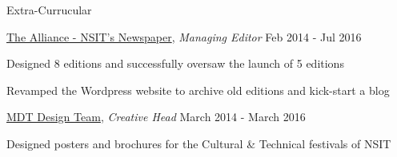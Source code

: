 \documentclass{resume} %
\begin{document}

        



\begin{rSection}{Extra-Currucular} \itemsep -3pt

    \begin{rSubsection}
        {\href{http://alliancensit.com/our-editions/}{The Alliance - NSIT's Newspaper}, {\normalfont \em Managing Editor}}
            {Feb 2014 - Jul 2016}
        {}{}
        
        \item Designed 8 editions and successfully oversaw the launch of 5 editions
        \item Revamped the Wordpress website to archive old editions and kick-start a blog
    \end{rSubsection}


    \begin{rSubsection}
        {\href{https://www.facebook.com/mokshansit}{MDT Design Team}, {\normalfont \em Creative Head}}
            {March 2014 - March 2016}
        {}{}
        \item Designed posters and brochures for the Cultural \& Technical festivals of NSIT
    \end{rSubsection}


\end{rSection}
\end{document}
